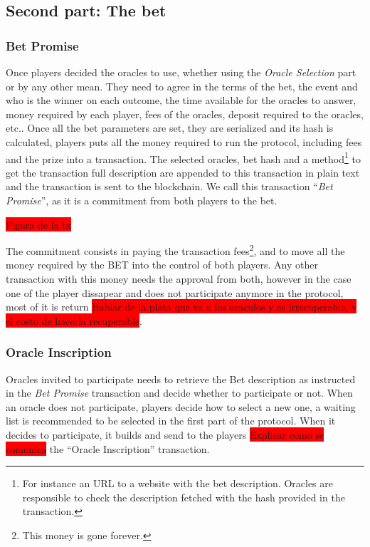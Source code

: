 \subsection{Second part: The bet}

\subsubsection{Bet Promise}
Once players decided the oracles to use, whether using the \textit{Oracle
  Selection} part or by any other mean.
They need to agree in the terms of the bet, the event and who is the winner on
  each outcome, the time available for the oracles to answer, money required by
  each player, fees of the  oracles, deposit required to the oracles, etc..
Once all the bet parameters are set, they are serialized and its hash is
  calculated, players puts all the money required to run the protocol,
  including fees and the prize into a transaction.
The selected oracles, bet hash and a method\footnote{For instance an URL to a
  website with the bet description. Oracles are responsible to check the
  description fetched with the hash provided in the transaction.} to get the
  transaction full description are appended to this transaction in plain text
  and the transaction is sent to the blockchain.
We call this transaction ``\textit{Bet Promise}'', as it is a commitment from both
  players to the bet.

\colorbox{red}{Figura de la tx}

The commitment consists in paying the transaction fees\footnote{This money is
  gone forever.}, and to move all the money required by the BET into the control
  of both players.
Any other transaction with this money needs the approval from both, however in
  the case one of the player dissapear and does not participate anymore in the
  protocol, most of it is return \colorbox{red}{Hablar de la plata que va a los
  oraculos y es irrecuperable, y el costo de hacerla recuperable}.

\subsubsection{Oracle Inscription}
Oracles invited to participate needs to retrieve the Bet description as
  instructed in the \textit{Bet Promise} transaction and decide whether to
  participate or not.
When an oracle does not participate, players decide how to select a new one,
  a waiting list is recommended to be selected in the first part of the
  protocol.
When it decides to participate, it builds and send to the players
  \colorbox{red}{Explicar como se comunica} the ``Oracle Inscription''
  transaction.


